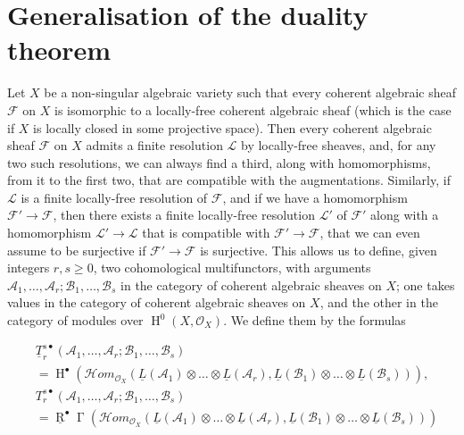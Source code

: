 \section{Generalisation of the duality theorem}\label{fga1-8}


Let $X$ be a non-singular algebraic variety such that every coherent algebraic sheaf $\mathcal{F}$ on $X$ is isomorphic to a locally-free coherent algebraic sheaf (which is the case if $X$ is locally closed in some projective space).
Then every coherent algebraic sheaf $\mathcal{F}$ on $X$ admits a finite resolution $\mathcal{L}$ by locally-free sheaves, and, for any two such resolutions, we can always find a third, along with homomorphisms, from it to the first two, that are compatible with the augmentations.
Similarly, if $\mathcal{L}$ is a finite locally-free resolution of $\mathcal{F}$, and if we have a homomorphism $\mathcal{F}'\to\mathcal{F}$, then there exists a finite locally-free resolution $\mathcal{L}'$ of $\mathcal{F}'$ along with a homomorphism $\mathcal{L}'\to\mathcal{L}$ that is compatible with $\mathcal{F}'\to\mathcal{F}$, that we can even assume to be surjective if $\mathcal{F}'\to\mathcal{F}$ is surjective.
This allows us to define, given integers $r,s\geqslant0$, two cohomological multifunctors, with arguments $\mathcal{A}_1,\ldots,\mathcal{A}_r;\mathcal{B}_1,\ldots,\mathcal{B}_s$ in the category of coherent algebraic sheaves on $X$;
one takes values in the category of coherent algebraic sheaves on $X$, and the other in the category of modules over $\operatorname{H}^0(X,\mathcal{O}_X)$.
We define them by the formulas

\begin{equation}\tag{8.1}\label{fga1-equation-8.1}
  \begin{aligned}
     & \underline{T}_r^{s\bullet}(\mathcal{A}_1,\ldots,\mathcal{A}_r;\mathcal{B}_1,\ldots,\mathcal{B}_s)
    \\&= \operatorname{H}^\bullet(\mathcal{H}om_{\mathcal{O}_X}(\underline{L}(\mathcal{A}_1)\otimes\ldots\otimes\underline{L}(\mathcal{A}_r), \underline{L}(\mathcal{B}_1)\otimes\ldots\otimes\underline{L}(\mathcal{B}_s))),
    \\&T_r^{s\bullet}(\mathcal{A}_1,\ldots,\mathcal{A}_r;\mathcal{B}_1,\ldots,\mathcal{B}_s)
    \\&= \underline{\operatorname{R}}^\bullet\operatorname{\Gamma}(\mathcal{H}om_{\mathcal{O}_X}(\underline{L}(\mathcal{A}_1)\otimes\ldots\otimes\underline{L}(\mathcal{A}_r), \underline{L}(\mathcal{B}_1)\otimes\ldots\otimes\underline{L}(\mathcal{B}_s)))
  \end{aligned}
\end{equation}

